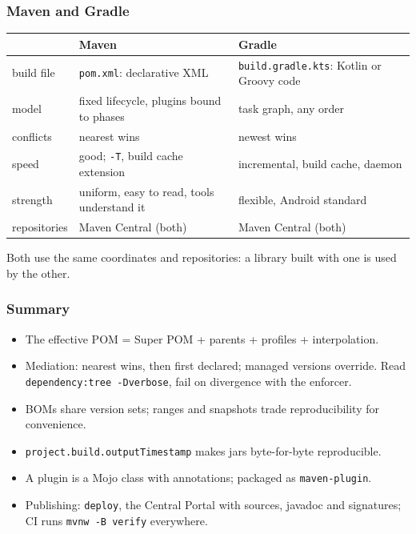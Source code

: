 \documentclass[aspectratio=169,10pt,compress]{beamer}
\begin{document}
\begin{frame}[t,fragile] \frametitle{Maven and Gradle}
  \begin{center}\small
  \begin{tabular}{@{}L{0.24\textwidth}L{0.34\textwidth}L{0.34\textwidth}@{}}
    \toprule
                         & \textbf{Maven}                         & \textbf{Gradle} \\
    \midrule
    build file           & \texttt{pom.xml}: declarative XML      & \texttt{build.gradle.kts}: Kotlin or Groovy code \\
    model                & fixed lifecycle, plugins bound to phases & task graph, any order \\
    conflicts            & nearest wins                           & newest wins \\
    speed                & good; \texttt{-T}, build cache extension & incremental, build cache, daemon \\
    strength             & uniform, easy to read, tools understand it & flexible, Android standard \\
    repositories         & Maven Central (both)                   & Maven Central (both) \\
    \bottomrule
  \end{tabular}
  \end{center}
  \small Both use the same coordinates and repositories: a library built with one is used by the other.
\end{frame}





\begin{frame}[t,fragile] \frametitle{Summary}
  \begin{itemize}\small
    \item The effective POM = Super POM + parents + profiles + interpolation.
    \item Mediation: nearest wins, then first declared; managed versions override. Read \texttt{dependency:tree -Dverbose}, fail on divergence with the enforcer.
    \item BOMs share version sets; ranges and snapshots trade reproducibility for convenience.
    \item \texttt{project.build.outputTimestamp} makes jars byte-for-byte reproducible.
    \item A plugin is a Mojo class with annotations; packaged as \texttt{maven-plugin}.
    \item Publishing: \texttt{deploy}, the Central Portal with sources, javadoc and signatures; CI runs \texttt{mvnw -B verify} everywhere.
  \end{itemize}
\end{frame}
\end{document}
